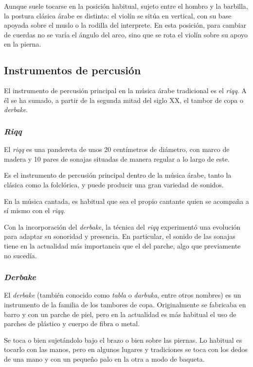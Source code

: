     Aunque suele tocarse en la posición habitual, sujeto entre el hombro y la barbilla, la postura clásica árabe es distinta: el violín se sitúa en vertical, con su base apoyada sobre el muslo o la rodilla del interprete. En esta posición, para cambiar de cuerdas no se varía el ángulo del arco, sino que se rota el violín sobre su apoyo en la pierna.

    \subsection{Instrumentos de percusión}

        El instrumento de percusión principal en la música árabe tradicional es el \emph{riqq}. A él se ha sumado, a partir de la segunda mitad del siglo \textsc{XX}, el tambor de copa o \emph{derbake}.

        \subsubsection{\emph{Riqq}}

        El \emph{riqq} es una pandereta de unos 20 centímetros de diámetro, con marco de madera y 10 pares de sonajas situadas de manera regular a lo largo de este.

        Es el instrumento de percusión principal dentro de la música árabe, tanto la clásica como la folclórica, y puede producir una gran variedad de sonidos.

        En la música cantada, es habitual que sea el propio cantante quien se acompaña a sí mismo con el \emph{riqq}.

        Con la incorporación del \emph{derbake}, la técnica del \emph{riqq} experimentó una evolución para adaptar su sonoridad y presencia. En particular, el sonido de las sonajas tiene en la actualidad más importancia que el del parche, algo que previamente no sucedía.

        \subsubsection{\emph{Derbake}}

        El \emph{derbake} (también conocido como \emph{tabla} o \emph{darbuka}, entre otros nombres) es un instrumento de la familia de los tambores de copa. Originalmente se fabricaba en barro y con un parche de piel, pero en la actualidad es más habitual el uso de parches de plástico y cuerpo de fibra o metal.

        Se toca o bien sujetándolo bajo el brazo o bien sobre las piernas. Lo habitual es tocarlo con las manos, pero en algunos lugares y tradiciones se toca con los dedos de una mano y con un pequeño palo en la otra a modo de baqueta.


